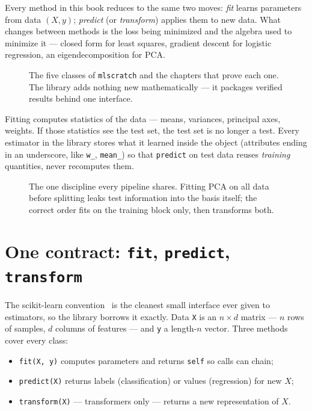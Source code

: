 Every method in this book reduces to the same two moves: \emph{fit}
learns parameters from data $(X,y)$; \emph{predict} (or
\emph{transform}) applies them to new data. What changes between
methods is the loss being minimized and the algebra used to minimize
it --- closed form for least squares, gradient descent for logistic
regression, an eigendecomposition for PCA\@.

\begin{figure}[htbp]
\centering

\caption{The five classes of \texttt{mlscratch} and the chapters that
prove each one. The library adds nothing new mathematically --- it
packages verified results behind one interface.}
\label{fig:ch16map}
\end{figure}

\begin{principle}
Fitting computes statistics of the data --- means, variances,
principal axes, weights. If those statistics see the test set, the
test set is no longer a test. Every estimator in the library stores
what it learned inside the object (attributes ending in an
underscore, like \texttt{w\_}, \texttt{mean\_}) so that
\texttt{predict} on test data reuses \emph{training} quantities,
never recomputes them.
\end{principle}

\begin{figure}[htbp]
\centering

\caption{The one discipline every pipeline shares. Fitting PCA on all
data before splitting leaks test information into the basis itself;
the correct order fits on the training block only, then transforms
both.}
\label{fig:leakage}
\end{figure}

\section{One contract: \texttt{fit}, \texttt{predict},
\texttt{transform}}\label{sec:contract}

The scikit-learn convention~\cite{sklearn} is the cleanest small
interface ever given to estimators, so the library borrows it
exactly. Data \texttt{X} is an $n\times d$ matrix --- $n$ rows of
samples, $d$ columns of features --- and \texttt{y} a length-$n$
vector. Three methods cover every class:

\begin{itemize}
\item \texttt{fit(X, y)} computes parameters and returns
\texttt{self} so calls can chain;
\item \texttt{predict(X)} returns labels (classification) or values
(regression) for new $X$;
\item \texttt{transform(X)} --- transformers only --- returns a new
representation of $X$.
\end{itemize}

